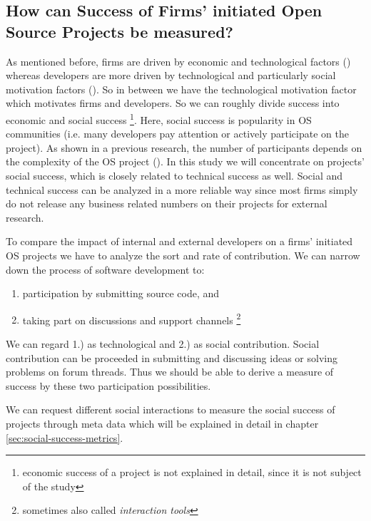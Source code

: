 \subsection{How can Success of Firms' initiated Open Source Projects be measured?}

As mentioned before, firms are driven by economic and technological factors (\cite{feller2002understanding}) whereas developers are more driven by technological and particularly social motivation factors (\cite{bonaccorsi2006comparing}). So in between we have the technological motivation factor which motivates firms and developers. So we can roughly divide success into economic and social success \footnote{economic success of a project is not explained in detail, since it is not subject of the study}. Here, social success is popularity in OS communities (i.e. many developers pay attention or actively participate on the project). As shown in a previous research, the number of participants depends on the complexity of the OS project (\cite{piezunka2013study}). In this study we will concentrate on projects' social success, which is closely related to technical success as well. Social and technical success can be analyzed in a more reliable way since most firms simply do not release any business related numbers on their projects for external research.

To compare the impact of internal and external developers on a firms' initiated OS projects we have to analyze the sort and rate of contribution. We can narrow down the process of software development to:

\begin{enumerate}
	\item participation by submitting source code, and
	\item taking part on discussions and support channels \footnote{sometimes also called \textit{interaction tools}}
\end{enumerate}

We can regard 1.) as technological and 2.) as social contribution. Social contribution can be proceeded in submitting and discussing ideas or solving problems on forum threads. Thus we should be able to derive a measure of success by these two participation possibilities.

We can request different social interactions to measure the social success of projects through meta data which will be explained in detail in chapter \ref{sec:social-success-metrics}.


